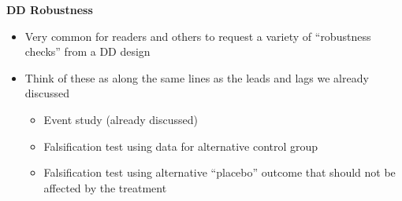 \documentclass[notes=show]{beamer}
\begin{document}
\begin{frame}[plain]
	\begin{center}
	\textbf{DD Robustness}
	\end{center}
	
	\begin{itemize}
	\item Very common for readers and others to request a variety of ``robustness checks'' from a DD design
	\item Think of these as along the same lines as the leads and lags we already discussed
		\begin{itemize}
		\item Event study (already discussed)
		\item Falsification test using data for alternative control group
		\item Falsification test using alternative ``placebo'' outcome that should not be affected by the treatment
		\end{itemize}
	\end{itemize}
\end{frame}
\end{document}

